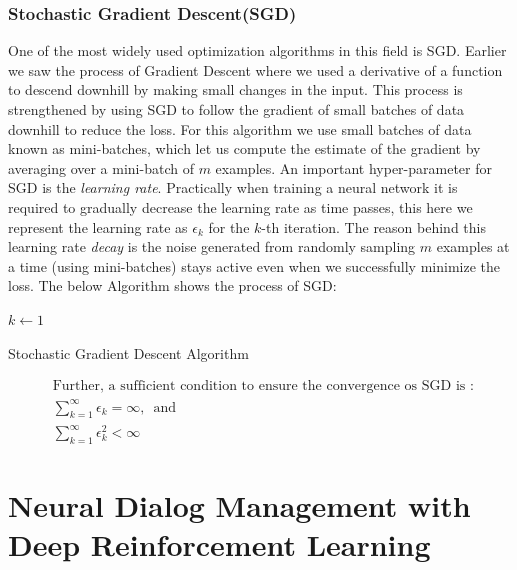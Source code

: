 \documentclass[14pt]{extarticle}
\numberwithin{equation}{section}
\begin{document}
	\subsubsection{Stochastic Gradient Descent(SGD)}\label{sgd}
	One of the most widely used optimization algorithms in this field is SGD. Earlier we saw the process of Gradient Descent where we used a derivative of a function to descend downhill by making small changes in the input. This process is strengthened by using SGD to follow the gradient of small batches of data downhill to reduce the loss. For this algorithm we use small batches of data known as mini-batches, which let us compute the estimate of the gradient by averaging over a mini-batch of $m$ examples. An important hyper-parameter for SGD is the \textit{learning rate}. Practically when training a neural network it is required to gradually decrease the learning rate as time passes, this here we represent the learning rate as $\epsilon_k$ for the $k$-th iteration. The reason behind this learning rate \textit{decay} is the noise generated from randomly sampling $m$ examples at a time (using mini-batches) stays active even when we successfully minimize the loss. The below Algorithm shows the process of SGD: 
	\begin{algorithm}[H]
		\DontPrintSemicolon
		\SetAlgoLined
		$k \gets 1$\;
		\caption{Stochastic Gradient Descent Algorithm}\label{alg:sgd}
	\end{algorithm}
	
	\begin{align}
	&\text{Further, a sufficient condition to ensure the convergence os SGD is : }\nonumber\\
	&\sum_{k=1}^{\infty}\epsilon_k = \infty \text{,     {}{}    and}\\
	&\sum_{k=1}^{\infty}\epsilon_k^2 < \infty
	\end{align}
	\pagebreak
	
	\section{Neural Dialog Management  with Deep Reinforcement Learning}\label{dm-with-drl}
\end{document}
